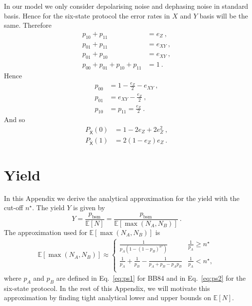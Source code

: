 \documentclass[aps,pra,reprint,superscriptaddress]{revtex4-1}
\newcommand{\san}[1]{\mathsf{#1}}
\newcommand{\nstar}{n^{\star}}
\begin{document}
In our model we only consider depolarising noise and dephasing noise in standard basis. Hence for the six-state protocol the error rates in $X$ and $Y$ basis will be the same. Therefore
\begin{align}
p_{10}+p_{11} &= e_Z\ , \\
p_{01}+p_{11} &= e_{XY}\ , \\
p_{01}+p_{10} &= e_{XY}\ , \\
p_{00} + p_{01} + p_{10} + p_{11} &= 1\ .
\end{align}
Hence
\begin{align}
p_{00} &= 1 - \frac{e_Z}{2} - e_{XY}\ ,\\
p_{01} &=  e_{XY} - \frac{e_Z}{2}\ ,\\
p_{10} &= p_{11} = \frac{e_Z}{2}\ .
\end{align}
And so
\begin{align}
P_{\bar{\san{X}}}(0) &= 1-2e_Z + 2e_Z^2\ ,\\
P_{\bar{\san{X}}}(1) &= 2(1-e_Z)e_Z\ .
\end{align}

\section{Yield}
\label{sec:yieldderiv}
In this Appendix we derive the analytical approximation for the yield
with the cut-off $\nstar$. The yield $Y$ is given by
\begin{equation}
Y = \frac{p_{\textrm{bsm}}}{\mathbb{E}\left[N\right]} = \frac{p_{\textrm{bsm}}}{\mathbb{E}\left[\max(N_A, N_B)\right]}\label{eq:yielddefinition}\ .
\end{equation}
The approximation used for $\mathbb{E}\left[\max(N_A, N_B)\right]$ is
\begin{align}
\mathbb{E}\left[\max(N_A, N_B)\right] \approx  \left\{
\begin{array}{ll}
      \frac{1}{p_A\left(1-\left(1-p_B\right)^{\nstar}\right)} & \frac{1}{p_A}\geq \nstar \\
       \frac{1}{p_A}+\frac{1}{p_B}-\frac{1}{p_A+p_B-p_Ap_B} & \frac{1}{p_A}<\nstar , \\
\end{array} 
\right.
\end{align}
where $p_A$ and $p_B$ are defined in Eq.~\eqref{eq:ps1} for BB84 and in Eq.~\eqref{eq:ps2} for the six-state protocol.
In the rest of this Appendix, we will motivate this approximation by finding tight analytical lower and upper bounds on $\mathbb{E}\left[N\right]$.\\
\end{document}
